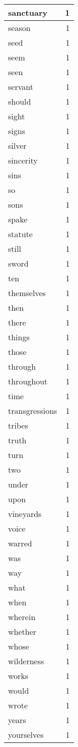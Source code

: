 \begin{center}
\begin{longtable}{l|r}
sanctuary & 1 \\ \hline
season & 1 \\ \hline
seed & 1 \\ \hline
seem & 1 \\ \hline
seen & 1 \\ \hline
servant & 1 \\ \hline
should & 1 \\ \hline
sight & 1 \\ \hline
signs & 1 \\ \hline
silver & 1 \\ \hline
sincerity & 1 \\ \hline
sins & 1 \\ \hline
so & 1 \\ \hline
sons & 1 \\ \hline
spake & 1 \\ \hline
statute & 1 \\ \hline
still & 1 \\ \hline
sword & 1 \\ \hline
ten & 1 \\ \hline
themselves & 1 \\ \hline
then & 1 \\ \hline
there & 1 \\ \hline
things & 1 \\ \hline
those & 1 \\ \hline
through & 1 \\ \hline
throughout & 1 \\ \hline
time & 1 \\ \hline
transgressions & 1 \\ \hline
tribes & 1 \\ \hline
truth & 1 \\ \hline
turn & 1 \\ \hline
two & 1 \\ \hline
under & 1 \\ \hline
upon & 1 \\ \hline
vineyards & 1 \\ \hline
voice & 1 \\ \hline
warred & 1 \\ \hline
was & 1 \\ \hline
way & 1 \\ \hline
what & 1 \\ \hline
when & 1 \\ \hline
wherein & 1 \\ \hline
whether & 1 \\ \hline
whose & 1 \\ \hline
wilderness & 1 \\ \hline
works & 1 \\ \hline
would & 1 \\ \hline
wrote & 1 \\ \hline
years & 1 \\ \hline
yourselves & 1 \\ \hline
\end{longtable}
\end{center}



